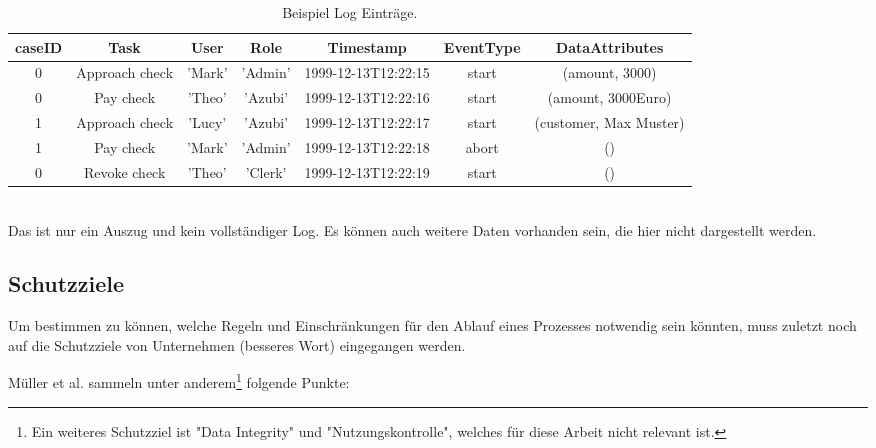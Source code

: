 \begin{table}[h!]
\footnotesize
  \centering
  \begin{tabular}{|c|c|c|c|c|c|c|}
  \hline
  caseID & Task & User & Role & Timestamp & EventType & DataAttributes\\
  \hline
  0 & Approach check &'Mark' &'Admin' &1999-12-13T12:22:15 & start&(amount, 3000)\\
  0 & Pay check & 'Theo' &'Azubi' &1999-12-13T12:22:16 & start&(amount, 3000Euro)\\
  1 & Approach check &'Lucy' & 'Azubi' &1999-12-13T12:22:17 &start&(customer, Max Muster)\\
  1 & Pay check &'Mark' & 'Admin' &1999-12-13T12:22:18 & abort&()\\
  0 & Revoke check & 'Theo' & 'Clerk' & 1999-12-13T12:22:19 & start&()\\
  \hline
  \end{tabular}
\\
Das ist nur ein Auszug und kein vollständiger Log. Es können auch weitere Daten vorhanden sein, die hier nicht dargestellt werden.
  \caption{Beispiel Log Einträge. }
  \label{tab:examplelog}
\end{table}



\subsection{Schutzziele}

Um bestimmen zu können, welche Regeln und Einschränkungen für den Ablauf eines Prozesses notwendig sein könnten, muss zuletzt noch auf die Schutzziele von Unternehmen (besseres Wort) eingegangen werden.

Müller et al. \cite{mueller_accorsi} sammeln unter anderem\footnote{Ein weiteres Schutzziel ist "Data Integrity" und "Nutzungskontrolle", welches für diese Arbeit nicht relevant ist.} folgende Punkte:\\

